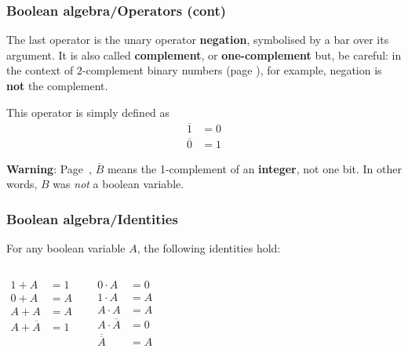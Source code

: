 % 
\begin{frame}
\frametitle{Boolean algebra/Operators (cont)}
\label{def_not}

The last operator is the unary operator \textbf{negation}, symbolised
by a bar over its argument. It is also called \textbf{complement}, or
\textbf{one-complement} but, be careful: in the context of
\(2\)-complement binary numbers (page \pageref{two_complement}), for
example, negation is \textbf{not} the complement.

This operator is simply defined as
\begin{align*}
\overline{1} &= 0\\
\overline{0} &= 1
\end{align*}

\textbf{Warning}: Page~\pageref{one_complement}, \(\overline{B}\)
means the 1-complement of an \textbf{integer}, not one bit. In other
words, \(B\) was \emph{not} a boolean variable.

\end{frame}

% 
\begin{frame}
\frametitle{Boolean algebra/Identities}

For any boolean variable \(A\), the following identities hold:

\medskip

\begin{columns}
    \begin{align}
      1 + A &= 1 \label{or:1A}\\
      0 + A &= A \label{or:0A}\\
      A + A &= A \label{or:AA}\\
      A + \overline{A} &= 1 \label{or:AnA}
    \end{align}

    \begin{align}
      0 \cdot A &= 0 \label{and:0A}\\
      1 \cdot A &= A \label{and:1A}\\
      A \cdot A &= A \label{and:AA}\\
      A \cdot \overline{A} &= 0 \label{and:AnA}\\
      \overline{\overline{A}} &= A \label{not:A}
    \end{align}
\end{columns}

\end{frame}

